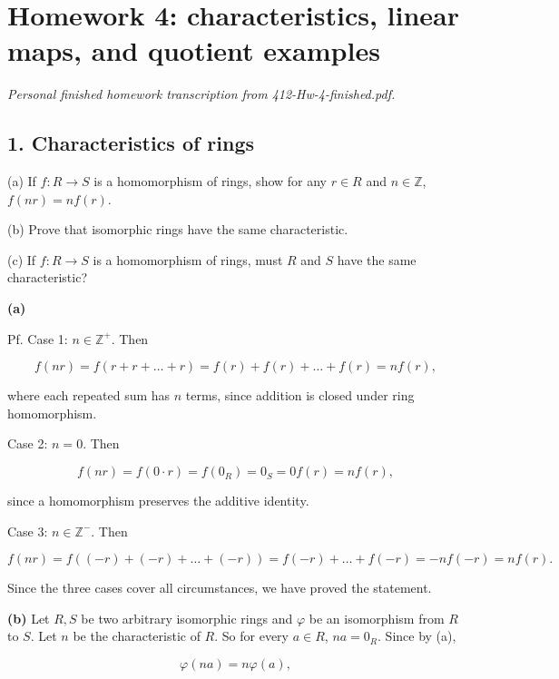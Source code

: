 \chapter{Homework 4: characteristics, linear maps, and quotient examples}

\emph{Personal finished homework transcription from 412-Hw-4-finished.pdf.}

\section{1. Characteristics of rings}

(a) If \(f:R\rightarrow S\) is a homomorphism of rings, show for any \(r \in R\) and \(n \in \mathbb{Z}\), \(f\left( {nr} \right) = nf(r)\).

(b) Prove that isomorphic rings have the same characteristic.

(c) If \(f:R\rightarrow S\) is a homomorphism of rings, must \(R\) and \(S\) have the same characteristic?

\textbf{(a)}

Pf. Case 1: \(n \in \mathbb{Z}^{+}\). Then

\[f\left( {nr} \right) = f\left( {r + r + \ldots + r} \right) = f(r) + f(r) + \ldots + f(r) = nf(r),\]

where each repeated sum has \(n\) terms, since addition is closed under ring homomorphism.

Case 2: \(n = 0\). Then

\[f\left( {nr} \right) = f\left( {0 \cdot r} \right) = f\left( 0_{R} \right) = 0_{S} = 0f(r) = nf(r),\]

since a homomorphism preserves the additive identity.

Case 3: \(n \in \mathbb{Z}^{-}\). Then

\[f\left( {nr} \right) = f\left( {\left( {- r} \right) + \left( {- r} \right) + \ldots + \left( {- r} \right)} \right) = f\left( {- r} \right) + \ldots + f\left( {- r} \right) = - nf\left( {- r} \right) = nf(r).\]

Since the three cases cover all circumstances, we have proved the statement.

\textbf{(b)} Let \(R,S\) be two arbitrary isomorphic rings and \(\varphi\) be an isomorphism from \(R\) to \(S\). Let \(n\) be the characteristic of \(R\). So for every \(a \in R\), \(na = 0_{R}\). Since by (a),

\[\varphi\left( {na} \right) = n\varphi(a),\]

